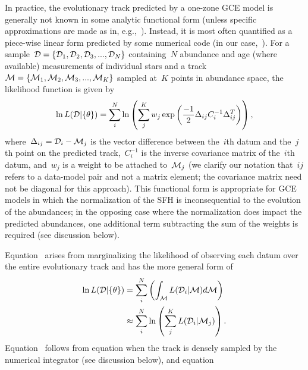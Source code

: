 In practice, the evolutionary track predicted by a one-zone GCE model is
generally not known in some analytic functional form (unless specific
approximations are made as in, e.g.,~\citealp{Weinberg2017b}).
Instead, it is most often quantified as a piece-wise linear form predicted by
some numerical code (in our case,~\vice).
For a sample~$\mathcal{D} = \{\mathcal{D}_1, \mathcal{D}_2, \mathcal{D}_3, ...,
\mathcal{D}_N\}$ containing~$N$ abundance and age (where available) measurements
of individual stars and a track~$\mathcal{M} = \{\mathcal{M}_1, \mathcal{M}_2,
\mathcal{M}_3, ..., \mathcal{M}_K\}$ sampled at~$K$ points in abundance space,
the likelihood function is given by
\begin{equation}
\ln L(\mathcal{D} | \{\theta\}) = \sum_i^N \ln \left(
\sum_j^K w_j \exp\left(
\frac{-1}{2}\Delta_{ij}C_i^{-1}\Delta_{ij}^T
\right)
\right),
\label{dga:eq:likelihood}
\end{equation}
where~$\Delta_{ij} = \mathcal{D}_i - \mathcal{M}_j$ is the vector difference
between the~$i$th datum and the~$j$th point on the predicted track,~$C_i^{-1}$
is the inverse covariance matrix of the~$i$th datum, and~$w_j$ is a weight to
be attached to~$\mathcal{M}_j$ (we clarify our notation that~$ij$ refers to a
data-model pair and not a matrix element; the covariance matrix need not be
diagonal for this approach).
This functional form is appropriate for GCE models in which the normalization
of the SFH is inconsequential to the evolution of the abundances; in the
opposing case where the normalization does impact the predicted abundances,
one additional term subtracting the sum of the weights is required (see
discussion below).
\par
Equation~ arises from marginalizing the likelihood of
observing each datum over the entire evolutionary track and has the more
general form of
\begin{subequations}\begin{align}
\ln L(\mathcal{D} | \{\theta\}) &= \sum_i^N \left(
\int_{\mathcal{M}} L(\mathcal{D}_i | \mathcal{M}) d\mathcal{M}
\right)
\label{dga:eq:likelihood_general_int}
\\
&\approx \sum_i^N \ln \left(
\sum_j^K L(\mathcal{D}_i | \mathcal{M}_j)\right).
\label{dga:eq:likelihood_general}
\end{align}\end{subequations}
Equation~ follows from equation
 when the track is densely sampled by the
numerical integrator (see discussion below), and equation~
